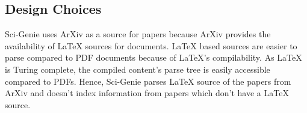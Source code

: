 \subsection{Design Choices}
Sci-Genie uses ArXiv as a source for papers because ArXiv provides the availability of LaTeX sources for documents. LaTeX based sources are easier to parse compared to PDF documents because of LaTeX's compilability. As LaTeX is Turing complete, the compiled content’s parse tree is easily accessible compared to PDFs. Hence, Sci-Genie parses LaTeX source of the papers from ArXiv and doesn't index information from papers which don't have a LaTeX source.
